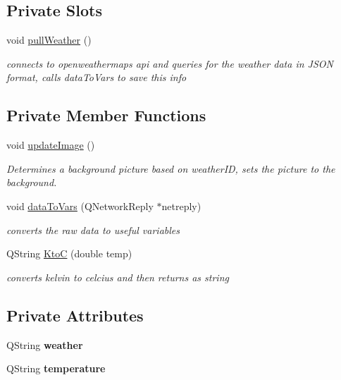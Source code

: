 \subsection*{Private Slots}
\begin{DoxyCompactItemize}
\item 
void \mbox{\hyperlink{classweatherpanel_a212139bb98a83e8c52b30bbe786b8bb1}{pull\+Weather}} ()
\begin{DoxyCompactList}\small\item\em connects to openweathermaps api and queries for the weather data in J\+S\+ON format, calls data\+To\+Vars to save this info \end{DoxyCompactList}\end{DoxyCompactItemize}
\subsection*{Private Member Functions}
\begin{DoxyCompactItemize}
\item 
void \mbox{\hyperlink{classweatherpanel_a56353d725e339accc2952eda96d65907}{update\+Image}} ()
\begin{DoxyCompactList}\small\item\em Determines a background picture based on weather\+ID, sets the picture to the background. \end{DoxyCompactList}\item 
void \mbox{\hyperlink{classweatherpanel_a5a3f8862f3f1ae01783a3e0bc084ba69}{data\+To\+Vars}} (Q\+Network\+Reply $\ast$netreply)
\begin{DoxyCompactList}\small\item\em converts the raw data to useful variables \end{DoxyCompactList}\item 
Q\+String \mbox{\hyperlink{classweatherpanel_aa060e2d25c499b202688fdb0ed2e51f0}{KtoC}} (double temp)
\begin{DoxyCompactList}\small\item\em converts kelvin to celcius and then returns as string \end{DoxyCompactList}\end{DoxyCompactItemize}
\subsection*{Private Attributes}
\begin{DoxyCompactItemize}
\item 
\mbox{\label{classweatherpanel_a03b9e1f4ca93f6ffb835ed19c3645d91}} 
Q\+String {\bfseries weather}
\item 
\mbox{\label{classweatherpanel_ab2c38c795e09f961485bef0c2f36165c}} 
Q\+String {\bfseries temperature}
\end{DoxyCompactItemize}


